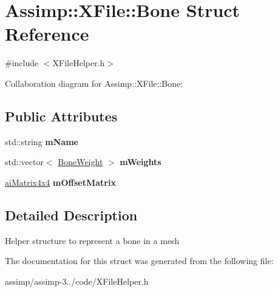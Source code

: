 \hypertarget{struct_assimp_1_1_x_file_1_1_bone}{\section{Assimp\+:\+:X\+File\+:\+:Bone Struct Reference}
\label{struct_assimp_1_1_x_file_1_1_bone}
}


{\ttfamily \#include $<$X\+File\+Helper.\+h$>$}



Collaboration diagram for Assimp\+:\+:X\+File\+:\+:Bone\+:
\subsection*{Public Attributes}
\begin{DoxyCompactItemize}
\item 
\hypertarget{struct_assimp_1_1_x_file_1_1_bone_a0990fabb0b372e983f18bdb1e9dec035}{std\+::string {\bfseries m\+Name}}\label{struct_assimp_1_1_x_file_1_1_bone_a0990fabb0b372e983f18bdb1e9dec035}

\item 
\hypertarget{struct_assimp_1_1_x_file_1_1_bone_a8e0f37d79720fedf63d05948d2cceb10}{std\+::vector$<$ \hyperlink{struct_assimp_1_1_x_file_1_1_bone_weight}{Bone\+Weight} $>$ {\bfseries m\+Weights}}\label{struct_assimp_1_1_x_file_1_1_bone_a8e0f37d79720fedf63d05948d2cceb10}

\item 
\hypertarget{struct_assimp_1_1_x_file_1_1_bone_a7359908e7fd82e638cee4e72c0651c62}{\hyperlink{structai_matrix4x4}{ai\+Matrix4x4} {\bfseries m\+Offset\+Matrix}}\label{struct_assimp_1_1_x_file_1_1_bone_a7359908e7fd82e638cee4e72c0651c62}

\end{DoxyCompactItemize}


\subsection{Detailed Description}
Helper structure to represent a bone in a mesh 

The documentation for this struct was generated from the following file\+:\begin{DoxyCompactItemize}
\item 
assimp/assimp-\/3../code/X\+File\+Helper.\+h\end{DoxyCompactItemize}
